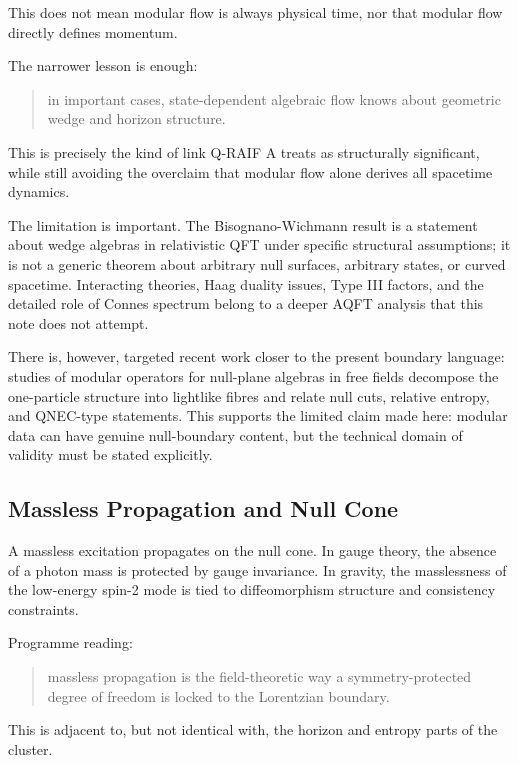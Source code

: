 \documentclass[12pt,a4paper]{article}
\theoremstyle{definition}
\theoremstyle{remark}
\begin{document}
This does not mean modular flow is always physical time, nor that
modular flow directly defines momentum.

The narrower lesson is enough:

\begin{quote}
in important cases, state-dependent algebraic flow knows about geometric
wedge and horizon structure.
\end{quote}

This is precisely the kind of link Q-RAIF A treats as structurally
significant, while still avoiding the overclaim that modular flow alone
derives all spacetime dynamics.

The limitation is important. The Bisognano-Wichmann result is a
statement about wedge algebras in relativistic QFT under specific
structural assumptions; it is not a generic theorem about arbitrary null
surfaces, arbitrary states, or curved spacetime. Interacting theories,
Haag duality issues, Type III factors, and the detailed role of Connes
spectrum belong to a deeper AQFT analysis that this note does not
attempt.

There is, however, targeted recent work closer to the present boundary
language: studies of modular operators for null-plane algebras in free
fields decompose the one-particle structure into lightlike fibres and
relate null cuts, relative entropy, and QNEC-type statements. This
supports the limited claim made here: modular data can have genuine
null-boundary content, but the technical domain of validity must be
stated explicitly.

\subsection{Massless Propagation and Null
Cone}\label{massless-propagation-and-null-cone}

A massless excitation propagates on the null cone. In gauge theory, the
absence of a photon mass is protected by gauge invariance. In gravity,
the masslessness of the low-energy spin-2 mode is tied to diffeomorphism
structure and consistency constraints.

Programme reading:

\begin{quote}
massless propagation is the field-theoretic way a symmetry-protected
degree of freedom is locked to the Lorentzian boundary.
\end{quote}

This is adjacent to, but not identical with, the horizon and entropy
parts of the cluster.
\end{document}
